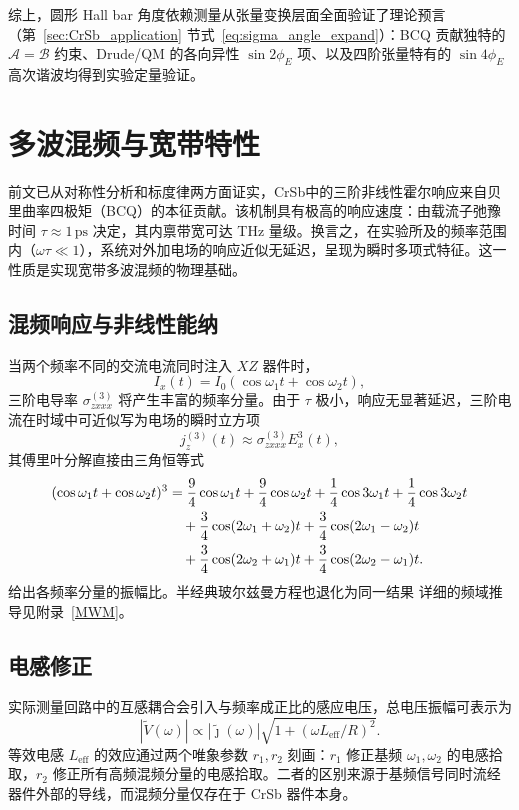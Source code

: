 综上，圆形 Hall bar 角度依赖测量从张量变换层面全面验证了理论预言（第~\ref{sec:CrSb_application} 节式~\eqref{eq:sigma_angle_expand}）：BCQ 贡献独特的 $\mathcal{A}=\mathcal{B}$ 约束、Drude/QM 的各向异性 $\sin 2\phi_E$ 项、以及四阶张量特有的 $\sin 4\phi_E$ 高次谐波均得到实验定量验证。

\section{多波混频与宽带特性}

前文已从对称性分析和标度律两方面证实，CrSb中的三阶非线性霍尔响应来自贝里曲率四极矩（BCQ）的本征贡献。该机制具有极高的响应速度：由载流子弛豫时间 \(\tau\approx 1\,\mathrm{ps}\) 决定，其内禀带宽可达 THz 量级。换言之，在实验所及的频率范围内（\(\omega\tau \ll 1\)），系统对外加电场的响应近似无延迟，呈现为瞬时多项式特征。这一性质是实现宽带多波混频的物理基础。

\subsection{混频响应与非线性能纳}

当两个频率不同的交流电流同时注入 \(XZ\) 器件时，
\[
  I_x(t) = I_0(\cos\omega_1 t + \cos\omega_2 t),
\]
三阶电导率 \(\sigma^{(3)}_{zxxx}\) 将产生丰富的频率分量。由于 \(\tau\) 极小，响应无显著延迟，三阶电流在时域中可近似写为电场的瞬时立方项
\[
  j_z^{(3)}(t) \approx \sigma^{(3)}_{zxxx} E_x^3(t),
\]
其傅里叶分解直接由三角恒等式
\begin{align}
(\cos\omega_1 t + \cos\omega_2 t)^3
&= \frac{9}{4}\cos\omega_1 t + \frac{9}{4}\cos\omega_2 t
   + \frac{1}{4}\cos 3\omega_1 t + \frac{1}{4}\cos 3\omega_2 t \notag\\
&\quad + \frac{3}{4}\cos(2\omega_1+\omega_2)t
    + \frac{3}{4}\cos(2\omega_1-\omega_2)t \notag\\
&\quad + \frac{3}{4}\cos(2\omega_2+\omega_1)t
    + \frac{3}{4}\cos(2\omega_2-\omega_1)t .
\end{align}
给出各频率分量的振幅比。半经典玻尔兹曼方程也退化为同一结果
详细的频域推导见附录~\ref{MWM}。



\subsection{电感修正}

实际测量回路中的互感耦合会引入与频率成正比的感应电压，总电压振幅可表示为
\[
  |\tilde V(\omega)| \propto |\tilde\jmath(\omega)|
  \sqrt{1 + (\omega L_{\mathrm{eff}}/R)^2}.
\]
等效电感 \(L_{\mathrm{eff}}\) 的效应通过两个唯象参数 \(r_1, r_2\) 刻画：\(r_1\) 修正基频 \(\omega_1,\omega_2\) 的电感拾取，\(r_2\) 修正所有高频混频分量的电感拾取。二者的区别来源于基频信号同时流经器件外部的导线，而混频分量仅存在于 CrSb 器件本身。

